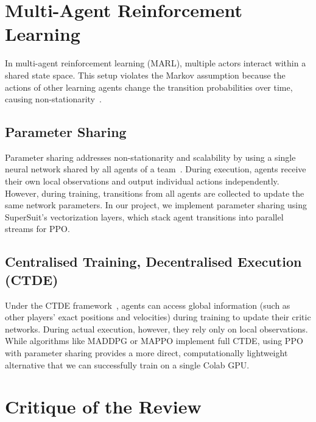 \section{Multi-Agent Reinforcement Learning}
\label{sec:lit_marl}

In multi-agent reinforcement learning (MARL), multiple actors interact within a shared state space. This setup violates the Markov assumption because the actions of other learning agents change the transition probabilities over time, causing non-stationarity~\citep{lowe2017multiagent}.

\subsection{Parameter Sharing}

Parameter sharing addresses non-stationarity and scalability by using a single neural network shared by all agents of a team~\citep{gupta2017cooperative}. During execution, agents receive their own local observations and output individual actions independently. However, during training, transitions from all agents are collected to update the same network parameters. In our project, we implement parameter sharing using SuperSuit's vectorization layers, which stack agent transitions into parallel streams for PPO.

\subsection{Centralised Training, Decentralised Execution (CTDE)}

Under the CTDE framework~\citep{lowe2017multiagent}, agents can access global information (such as other players' exact positions and velocities) during training to update their critic networks. During actual execution, however, they rely only on local observations. While algorithms like MADDPG or MAPPO implement full CTDE, using PPO with parameter sharing provides a more direct, computationally lightweight alternative that we can successfully train on a single Colab GPU.

\section{Critique of the Review}
\label{sec:lit_critique}

